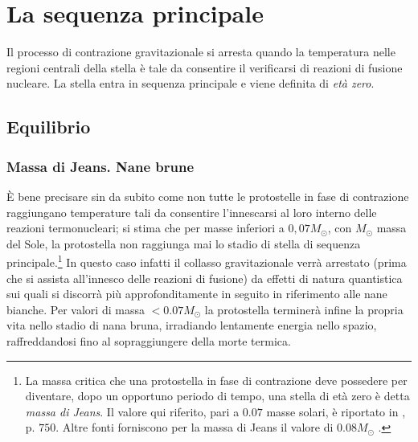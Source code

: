 
\chapter{La sequenza principale \label{stabilita}}
\minitoc\mtcskip

\noindent Il processo di contrazione gravitazionale si arresta quando la temperatura nelle regioni centrali della stella è tale da consentire il verificarsi di reazioni di fusione nucleare.
La stella entra in sequenza principale e viene definita di \emph{et\`{a} zero}.
\section{Equilibrio}\label{equilibrio}
\subsection{Massa di Jeans. Nane brune}\label{Jeans}
\`E bene precisare sin da subito come non tutte le protostelle in fase di contrazione raggiungano temperature tali da consentire l'innescarsi al loro interno delle reazioni termonucleari; si stima che per masse inferiori a $0,07 M_{\odot}$, con $M_{\odot}$ massa del Sole, la protostella non raggiunga mai lo stadio di stella di sequenza principale.\footnote{La massa critica che una protostella in fase di contrazione deve  possedere per diventare, dopo un opportuno periodo di tempo,  una stella di et\`{a} zero è detta \emph{massa di Jeans}. Il valore qui riferito, pari a $0.07$ masse solari, è riportato in \Cite{rosino}, p. $750$. Altre fonti forniscono per la massa di Jeans il valore di $0.08 M_{\odot}$ \citep{hack}.} In questo caso infatti il collasso gravitazionale verr\`{a} arrestato (prima che si assista all'innesco delle reazioni di fusione)  da effetti di natura quantistica sui quali si discorr\`{a} più approfonditamente in seguito in riferimento alle nane bianche.
Per valori di massa $<0.07 M_{\odot}$ la protostella terminer\`{a} infine la propria vita nello stadio di nana bruna, irradiando lentamente energia nello spazio, raffreddandosi fino al sopraggiungere della morte termica.
\par
